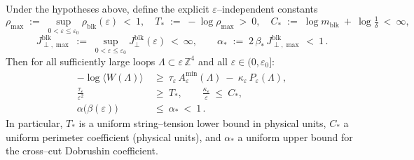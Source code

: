 \documentclass[11pt]{amsart}
\begin{document}
\begin{theorem}
\label{thm:uniform-kp}
Under the hypotheses above, define the explicit $\varepsilon$–independent constants
\[
  \rho_{\max}\;:=\;\sup_{0<\varepsilon\le \varepsilon_0}\rho_{\mathrm{blk}}(\varepsilon)\ <\ 1,\quad
  T_*\;:=\; -\log \rho_{\max}\ >\ 0,\quad
  C_*\;:=\; \log m_{\mathrm{blk}}\ +\ \log\tfrac{1}{\delta}\ <\ \infty,
\]
\[
  J^{\mathrm{blk}}_{\perp,\max}\;:=\;\sup_{0<\varepsilon\le\varepsilon_0} J^{\mathrm{blk}}_{\perp}(\varepsilon)\ <\ \infty,\qquad
  \alpha_*\;:=\;2\,\beta_*\,J^{\mathrm{blk}}_{\perp,\max}\ <\ 1\,.
\]
Then for all sufficiently large loops $\Lambda\subset\varepsilon\,\mathbb Z^4$ and all $\varepsilon\in(0,\varepsilon_0]$:
\begin{align}
  -\log\langle W(\Lambda)\rangle\ &\ge\ \tau_\varepsilon\,A_\varepsilon^{\min}(\Lambda)\ -\ \kappa_\varepsilon\,P_\varepsilon(\Lambda),\\
  \frac{\tau_\varepsilon}{\varepsilon^2}\ &\ge\ T_*,\qquad \frac{\kappa_\varepsilon}{\varepsilon}\ \le\ C_*,\\
  \alpha\bigl(\beta(\varepsilon)\bigr)\ &\le\ \alpha_*\ <\ 1\,.
\end{align}
In particular, $T_*$ is a uniform string–tension lower bound in physical units, $C_*$ a uniform perimeter coefficient (physical units), and $\alpha_*$ a uniform upper bound for the cross–cut Dobrushin coefficient.
\end{theorem}
\end{document}
